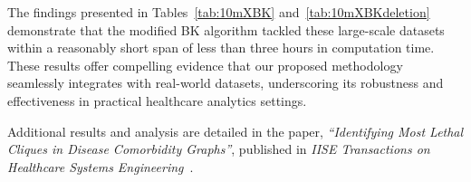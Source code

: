 The findings presented in Tables~\ref{tab:10mXBK} and~\ref{tab:10mXBKdeletion} demonstrate that the modified BK algorithm tackled these large-scale datasets within a reasonably short span of less than three hours in computation time. These results offer compelling evidence that our proposed methodology seamlessly integrates with real-world datasets, underscoring its robustness and effectiveness in practical healthcare analytics settings.

Additional results and analysis are detailed in the paper,
\textit{``Identifying Most Lethal Cliques in Disease Comorbidity Graphs''}, published in \textit{IISE Transactions on Healthcare Systems Engineering}~\citep{VaghfiMohebbi25}.






